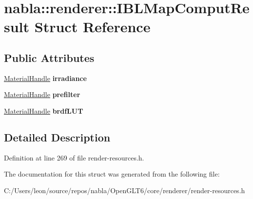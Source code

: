 \hypertarget{structnabla_1_1renderer_1_1_i_b_l_map_comput_result}{}\section{nabla\+::renderer\+::I\+B\+L\+Map\+Comput\+Result Struct Reference}
\label{structnabla_1_1renderer_1_1_i_b_l_map_comput_result}
\subsection*{Public Attributes}
\begin{DoxyCompactItemize}
\item 
\mbox{\label{structnabla_1_1renderer_1_1_i_b_l_map_comput_result_a8c093d5c848495de479844e44fa26303}} 
\mbox{\hyperlink{classnabla_1_1renderer_1_1_handle}{Material\+Handle}} {\bfseries irradiance}
\item 
\mbox{\label{structnabla_1_1renderer_1_1_i_b_l_map_comput_result_af3576baa7317633d9eee5f7fdb476934}} 
\mbox{\hyperlink{classnabla_1_1renderer_1_1_handle}{Material\+Handle}} {\bfseries prefilter}
\item 
\mbox{\label{structnabla_1_1renderer_1_1_i_b_l_map_comput_result_ad5a3bfb4bf6cad70d4ca5116fcd8e0d7}} 
\mbox{\hyperlink{classnabla_1_1renderer_1_1_handle}{Material\+Handle}} {\bfseries brdf\+L\+UT}
\end{DoxyCompactItemize}


\subsection{Detailed Description}


Definition at line 269 of file render-\/resources.\+h.



The documentation for this struct was generated from the following file\+:\begin{DoxyCompactItemize}
\item 
C\+:/\+Users/leon/source/repos/nabla/\+Open\+G\+L\+T6/core/renderer/render-\/resources.\+h\end{DoxyCompactItemize}
